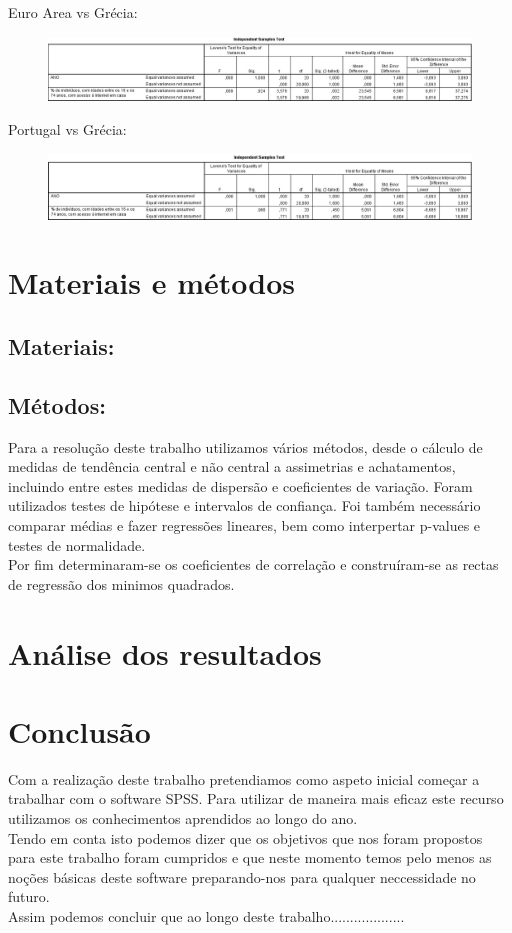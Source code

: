 \documentclass[a4paper,11pt]{article}
\begin{document}
Euro Area vs Grécia:
\begin{figure}[ht!]
\centering
\includegraphics[width=130mm]{EUareaVsGR}
\label{overflow}
\end{figure}


\newpage
Portugal vs Grécia:
\begin{figure}[ht!]
\centering
\includegraphics[width=130mm]{PTvsGR}
\label{overflow}
\end{figure}


\newpage
\section{Materiais e métodos}
\subsection{Materiais:}


\subsection{Métodos:}
\indent Para a resolução deste trabalho utilizamos vários métodos, desde o cálculo de medidas de tendência central e não central a assimetrias e achatamentos, incluindo entre estes medidas de dispersão e coeficientes de variação. Foram utilizados testes de hipótese e intervalos de confiança. Foi também necessário comparar médias e fazer regressões lineares, bem como interpertar p-values e testes de normalidade.\\
\indent Por fim determinaram-se os coeficientes de correlação e construíram-se as rectas de regressão dos minimos quadrados.

\newpage
\section{Análise dos resultados}

\newpage
\section{Conclusão}
\indent Com a realização deste trabalho pretendiamos como aspeto inicial começar a trabalhar com o software SPSS. Para utilizar de maneira mais eficaz este recurso utilizamos os conhecimentos aprendidos ao longo do ano.\\
\indent Tendo em conta isto podemos dizer que os objetivos que nos foram propostos para este trabalho foram cumpridos e que neste momento temos pelo menos as noções básicas deste software preparando-nos para qualquer neccessidade no futuro.\\
\indent Assim podemos concluir que ao longo deste trabalho...................
\end{document}
